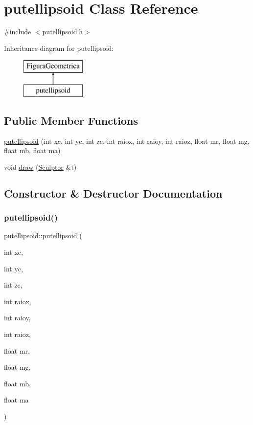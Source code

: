 \hypertarget{classputellipsoid}{}\section{putellipsoid Class Reference}
\label{classputellipsoid}


{\ttfamily \#include $<$putellipsoid.\+h$>$}

Inheritance diagram for putellipsoid\+:\begin{figure}[H]
\begin{center}
\leavevmode
\includegraphics[height=2.000000cm]{classputellipsoid}
\end{center}
\end{figure}
\subsection*{Public Member Functions}
\begin{DoxyCompactItemize}
\item 
\mbox{\hyperlink{classputellipsoid_ab5cff7eb7ea2a9e2b137683fec4042b2}{putellipsoid}} (int xc, int yc, int zc, int raiox, int raioy, int raioz, float mr, float mg, float mb, float ma)
\item 
void \mbox{\hyperlink{classputellipsoid_a716adca21bdfef33cf3a44b89361a29a}{draw}} (\mbox{\hyperlink{class_sculptor}{Sculptor}} \&t)
\end{DoxyCompactItemize}


\subsection{Constructor \& Destructor Documentation}
\mbox{\label{classputellipsoid_ab5cff7eb7ea2a9e2b137683fec4042b2}} 
\subsubsection{\texorpdfstring{putellipsoid()}{putellipsoid()}}
{\footnotesize\ttfamily putellipsoid\+::putellipsoid (\begin{DoxyParamCaption}\item[{int}]{xc,  }\item[{int}]{yc,  }\item[{int}]{zc,  }\item[{int}]{raiox,  }\item[{int}]{raioy,  }\item[{int}]{raioz,  }\item[{float}]{mr,  }\item[{float}]{mg,  }\item[{float}]{mb,  }\item[{float}]{ma }\end{DoxyParamCaption})}



